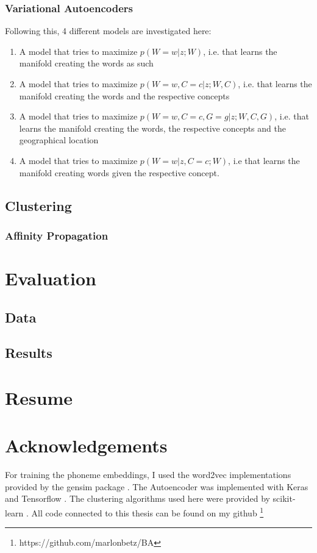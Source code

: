 \documentclass[8pt]{article}
\begin{document}
\subsubsection{Variational Autoencoders}

Following this, 4 different models are investigated here:
\begin{enumerate}
\item A model that tries to maximize $p(W=w|z;W)$, i.e. that learns the manifold creating the words as such
\item A model that tries to maximize $p(W=w,C=c|z;W,C)$, i.e. that learns the manifold creating the words and the respective concepts
\item A model that tries to maximize $p(W=w,C=c,G=g|z;W,C,G)$, i.e. that learns the manifold creating the words, the respective concepts and the geographical location
\item A model that tries to maximize $p(W=w|z,C=c;W)$, i.e that learns the manifold creating words given the respective concept.
\end{enumerate}

\subsection{Clustering}
\subsubsection{Affinity Propagation}
\section{Evaluation}
\subsection{Data}
\subsection{Results}
\section{Resume}
\section{Acknowledgements}
For training the phoneme embeddings, I used the word2vec implementations provided by the gensim package \cite{rehurek_lrec}. The Autoencoder was implemented with Keras \cite{chollet2015keras} and Tensorflow \cite{tensorflow2015-whitepaper}. The clustering algorithms used here were provided by scikit-learn \cite{scikit-learn}. All code connected to this thesis can be found on my github \footnote{https://github.com/marlonbetz/BA}




\end{document}
